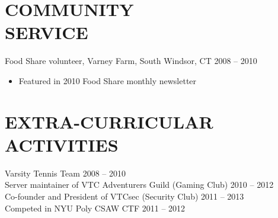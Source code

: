 \documentclass[margin]{res}
\begin{document}
\begin{resume}
\section{COMMUNITY \\ SERVICE} Food Share volunteer, Varney Farm, South 
                Windsor, CT \hfill 2008 -- 2010
                \begin{itemize}
                    \item Featured in 2010 Food Share monthly newsletter
                \end{itemize}

\section{EXTRA-CURRICULAR \\ ACTIVITIES} 
                Varsity Tennis Team \hfill 2008 -- 2010\\
                Server maintainer of VTC Adventurers Guild (Gaming Club)
                    \hfill 2010 -- 2012\\
                Co-founder and President of VTCsec (Security Club) 
                    \hfill 2011 -- 2013\\
                Competed in NYU Poly CSAW CTF \hfill 2011 -- 2012
 

\end{resume}
\end{document}

